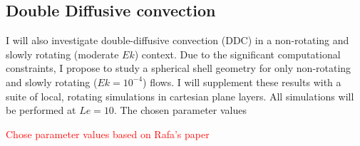\documentclass{article}
\begin{document}
\subsection{Double Diffusive convection}
I will also investigate double-diffusive convection (DDC) in a non-rotating and slowly rotating (moderate $Ek$) context. Due to the significant computational constraints, I propose to study a spherical shell geometry for only non-rotating and slowly rotating ($Ek = 10^{-4}$) flows. I will supplement these results with a suite of local, rotating simulations in cartesian plane layers. All simulations will be performed at $Le = 10$. The chosen parameter values 

\textcolor{red}{Chose parameter values based on Rafa's paper}
\begin{multicols}{2}

\printbibliography

\end{multicols}
\end{document}
